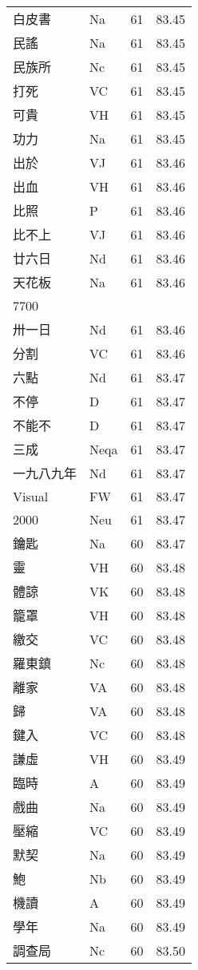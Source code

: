 \documentclass[twocolumn]{book}
\begin{document}
\begin{supertabular}{llrr}
白皮書 & Na & 61 &  83.45\\
民謠 & Na & 61 &  83.45\\
民族所 & Nc & 61 &  83.45\\
打死 & VC & 61 &  83.45\\
可貴 & VH & 61 &  83.45\\
功力 & Na & 61 &  83.45\\
出於 & VJ & 61 &  83.46\\
出血 & VH & 61 &  83.46\\
比照 & P & 61 &  83.46\\
比不上 & VJ & 61 &  83.46\\
廿六日 & Nd & 61 &  83.46\\
天花板 & Na & 61 &  83.46\\
7700\\
卅一日 & Nd & 61 &  83.46\\
分割 & VC & 61 &  83.46\\
六點 & Nd & 61 &  83.47\\
不停 & D & 61 &  83.47\\
不能不 & D & 61 &  83.47\\
三成 & Neqa & 61 &  83.47\\
一九八九年 & Nd & 61 &  83.47\\
Visual & FW & 61 &  83.47\\
2000 & Neu & 61 &  83.47\\
鑰匙 & Na & 60 &  83.47\\
靈 & VH & 60 &  83.48\\
體諒 & VK & 60 &  83.48\\
籠罩 & VH & 60 &  83.48\\
繳交 & VC & 60 &  83.48\\
羅東鎮 & Nc & 60 &  83.48\\
離家 & VA & 60 &  83.48\\
歸 & VA & 60 &  83.48\\
鍵入 & VC & 60 &  83.48\\
謙虛 & VH & 60 &  83.49\\
臨時 & A & 60 &  83.49\\
戲曲 & Na & 60 &  83.49\\
壓縮 & VC & 60 &  83.49\\
默契 & Na & 60 &  83.49\\
鮑 & Nb & 60 &  83.49\\
機讀 & A & 60 &  83.49\\
學年 & Na & 60 &  83.49\\
調查局 & Nc & 60 &  83.50\\

\end{supertabular}
\end{document}
